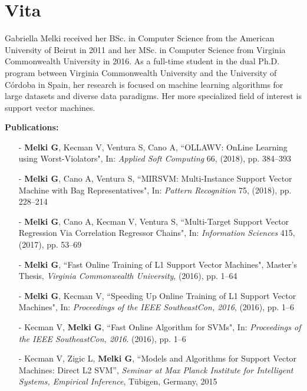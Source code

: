 \documentclass[reqno]{vcuthesis}
\numberwithin{equation}{chapter}
\begin{document}
\chapter*{Vita}
\thispagestyle{plain}
Gabriella Melki received her BSc. in Computer Science from the American University of Beirut in 2011 and her MSc. in Computer Science from Virginia Commonwealth University in 2016. As a full-time student in the dual Ph.D. program between Virginia Commonwealth University and the University of C\'{o}rdoba in Spain, her research is focused on machine learning algorithms for large datasets and diverse data paradigms. Her more specialized field of interest is support vector machines.

\textbf{Publications:}
\begin{itemize}
\item[-] \textbf{Melki G}, Kecman V, Ventura S, Cano A, ``OLLAWV: OnLine Learning using Worst-Violators", In: \textit{Applied Soft Computing} 66, (2018), pp. 384--393
\item[-] \textbf{Melki G}, Cano A, Ventura S, ``MIRSVM: Multi-Instance Support Vector Machine with Bag Representatives", In: \textit{Pattern Recognition} 75, (2018), pp. 228--214
\item[-] \textbf{Melki G}, Cano A, Kecman V, Ventura S, ``Multi-Target Support Vector Regression Via Correlation Regressor Chains", In: \textit{Information Sciences} 415, (2017), pp. 53--69
\item[-] \textbf{Melki G}, ``Fast Online Training of L1 Support Vector Machines", Master's Thesis, \textit{Virginia Commonwealth University}, (2016), pp. 1--64
\item[-] \textbf{Melki G}, Kecman V, ``Speeding Up Online Training of L1 Support Vector Machines", In: \textit{Proceedings of the IEEE SoutheastCon, 2016}, (2016), pp. 1--6
\item[-] Kecman V, \textbf{Melki G}, ``Fast Online Algorithm for SVMs", In: \textit{Proceedings of the IEEE SoutheastCon, 2016}. (2016), pp. 1--6
\item[-] Kecman V, Zigic L, \textbf{Melki G}, ``Models and Algorithms for Support Vector Machines: Direct L2 SVM'', \textit{Seminar at Max Planck Institute for Intelligent Systems, Empirical Inference}, T\"{u}bigen, Germany, 2015
\end{itemize}
\end{document}
